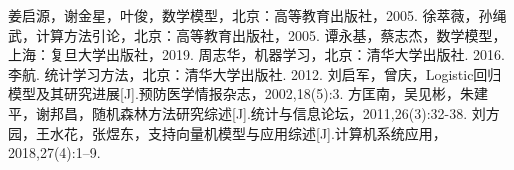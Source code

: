 \documentclass{article}
\numberwithin{equation}{section}						%
\numberwithin{figure}{section}							%
\begin{document}
	\begin{thebibliography}{99}
		 姜启源，谢金星，叶俊，数学模型，北京：高等教育出版社，2005.
		 徐萃薇，孙绳武，计算方法引论，北京：高等教育出版社，2005.
		 谭永基，蔡志杰，数学模型，上海：复旦大学出版社，2019.
		 周志华，机器学习，北京：清华大学出版社. 2016.
		 李航. 统计学习方法，北京：清华大学出版社. 2012.
		 刘启军，曾庆，Logistic回归模型及其研究进展[J].预防医学情报杂志，2002,18(5):3.
		 方匡南，吴见彬，朱建平，谢邦昌，随机森林方法研究综述[J].统计与信息论坛，2011,26(3):32-38.
		 刘方园，王水花，张煜东，支持向量机模型与应用综述[J].计算机系统应用，2018,27(4):1–9.
	\end{thebibliography}
\end{document}
